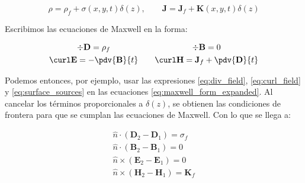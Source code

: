 \begin{equation}
    \rho = \rho_f + \sigma(x,y,t)\delta(z), 
    \qquad 
    \mathbf{J} = \mathbf{J}_f + \mathbf{K}(x,y,t)\delta(z)
    \label{eq:surface_sources}
\end{equation}

Escribimos las ecuaciones de Maxwell en la forma:

\begin{equation}
    \begin{gathered}
        \div \mathbf{D} = \rho_f \\
        \curl \mathbf{E} = -\pdv{\mathbf{B}}{t}
    \end{gathered}
    \qquad
    \begin{gathered}
        \div \mathbf{B} = 0 \\
        \curl \mathbf{H} = \mathbf{J}_f + \pdv{\mathbf{D}}{t}
    \end{gathered}
    \label{eq:maxwell_form_expanded}
\end{equation}

Podemos entonces, por ejemplo, usar las expresiones \eqref{eq:div_field}, \eqref{eq:curl_field} y \eqref{eq:surface_sources} en las ecuaciones \eqref{eq:maxwell_form_expanded}.  
Al cancelar los términos proporcionales a $\delta(z)$, se obtienen las condiciones de frontera para que se cumplan las ecuaciones de Maxwell. Con lo que se llega a:

\begin{equation}
    \begin{gathered}
        \hat{n} \cdot (\mathbf{D}_2 - \mathbf{D}_1) = \sigma_f \\
        \hat{n} \cdot (\mathbf{B}_2 - \mathbf{B}_1) = 0 \\
        \hat{n} \times (\mathbf{E}_2 - \mathbf{E}_1) = 0 \\
        \hat{n} \times (\mathbf{H}_2 - \mathbf{H}_1) = \mathbf{K}_f
    \end{gathered}
    \label{eq:boundary_conditions}
\end{equation}
